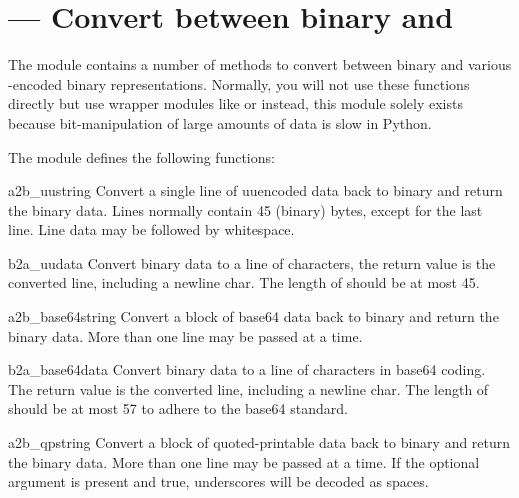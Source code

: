\section{ ---
         Convert between binary and \ASCII}



The  module contains a number of methods to convert
between binary and various \ASCII-encoded binary
representations. Normally, you will not use these functions directly
but use wrapper modules like  or
 instead, this module solely
exists because bit-manipulation of large amounts of data is slow in
Python.

The  module defines the following functions:

\begin{funcdesc}{a2b_uu}{string}
Convert a single line of uuencoded data back to binary and return the
binary data. Lines normally contain 45 (binary) bytes, except for the
last line. Line data may be followed by whitespace.
\end{funcdesc}

\begin{funcdesc}{b2a_uu}{data}
Convert binary data to a line of \ASCII{} characters, the return value
is the converted line, including a newline char. The length of
 should be at most 45.
\end{funcdesc}

\begin{funcdesc}{a2b_base64}{string}
Convert a block of base64 data back to binary and return the
binary data. More than one line may be passed at a time.
\end{funcdesc}

\begin{funcdesc}{b2a_base64}{data}
Convert binary data to a line of \ASCII{} characters in base64 coding.
The return value is the converted line, including a newline char.
The length of  should be at most 57 to adhere to the base64
standard.
\end{funcdesc}

\begin{funcdesc}{a2b_qp}{string}
Convert a block of quoted-printable data back to binary and return the
binary data. More than one line may be passed at a time.
If the optional argument  is present and true, underscores
will be decoded as spaces.
\end{funcdesc}

